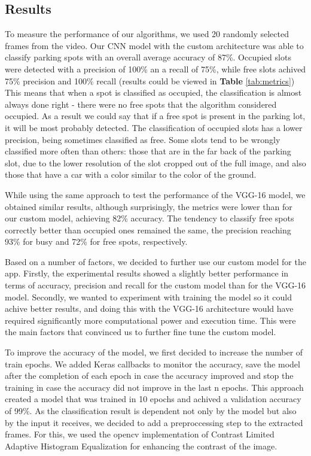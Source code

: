 \documentclass[12pt]{article}
\begin{document}
\subsection{Results}
To measure the performance of our algorithms, we used 20 randomly selected frames from the video. Our CNN model with the custom architecture was able to classify parking spots with an overall average accuracy of 87\%. Occupied slots were detected with a precision of 100\% an a recall of 75\%, while free slots achived 75\% precision and 100\% recall (results could be viewed in \textbf{Table} \ref{tab:metrics}) This means that when a spot is classified as occupied, the classification is almost always done right - there were no free spots that the algorithm considered occupied. As a result we could say that if a free spot is present in the parking lot, it will be most probably detected. The classification of occupied slots has a lower precision, being sometimes classified as free. Some slots tend to be wrongly classified more often than others: those that are in the far back of the parking slot, due to the lower resolution of the slot cropped out of the full image, and also those that have a car with a color similar to the color of the ground.

While using the same approach to test the performance of the VGG-16 model, we obtained similar results, although surprisingly, the metrics were lower than for our custom model, achieving 82\% accuracy. The tendency to classify free spots correctly better than occupied ones remained the same, the precision reaching 93\% for busy and 72\% for free spots, respectively. 

Based on a number of factors, we decided to further use our custom model for the app. Firstly, the experimental results showed a slightly better performance in terms of accuracy, precision and recall for the custom model than for the VGG-16 model. Secondly, we wanted to experiment with training the model so it could achive better results, and doing this with the VGG-16 architecture would have required significantly more computational power and execution time. This were the main factors that convinced us to further fine tune the custom model.

To improve the accuracy of the model, we first decided to increase the number of train epochs. We added Keras callbacks to monitor the accuracy, save the model after the completion of each epoch in case the accuracy improved and stop the training in case the accuracy did not improve in the last n epochs. This approach created a model that was trained in 10 epochs and achived a validation accuracy of 99\%.
As the classification result is dependent not only by the model but also by the input it receives, we decided to add a preproccessing step to the extracted frames. For this, we used the opencv implementation of Contrast Limited Adaptive Histogram Equalization for enhancing the contrast of the image.
\end{document}
